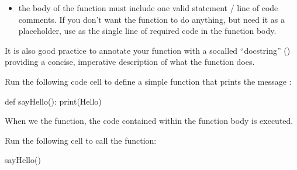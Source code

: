 \documentclass[letterpaper,10pt,english]{sphinxmanual}
\begin{document}
{\begin{itemize}
\item {} 
the body of the function must include  one valid statement / line of code  comments. If you don’t want the function to do anything, but need it as a placeholder, use  as the single line of required code in the function body.

\end{itemize}

It is also good practice to annotate your function with a so\sphinxhyphen{}called “docstring” () providing a concise, imperative description of what the function does.

\begin{sphinxVerbatim}[commandchars=\\\{\}]
 
\end{sphinxVerbatim}

Run the following code cell to define a simple function that prints the message :

{
\begin{sphinxVerbatim}[commandchars=\\\{\}]
\llap{\color{nbsphinxin}[ ]:\,\hspace{\fboxrule}\hspace{\fboxsep}}def sayHello():
    print(\PYGZsq{}Hello\PYGZsq{})
\end{sphinxVerbatim}
}

When we  the function, the code contained within the function body is executed.

Run the following cell to call the function:

{
\begin{sphinxVerbatim}[commandchars=\\\{\}]
\llap{\color{nbsphinxin}[ ]:\,\hspace{\fboxrule}\hspace{\fboxsep}}sayHello()
\end{sphinxVerbatim}
}

}
\end{document}
